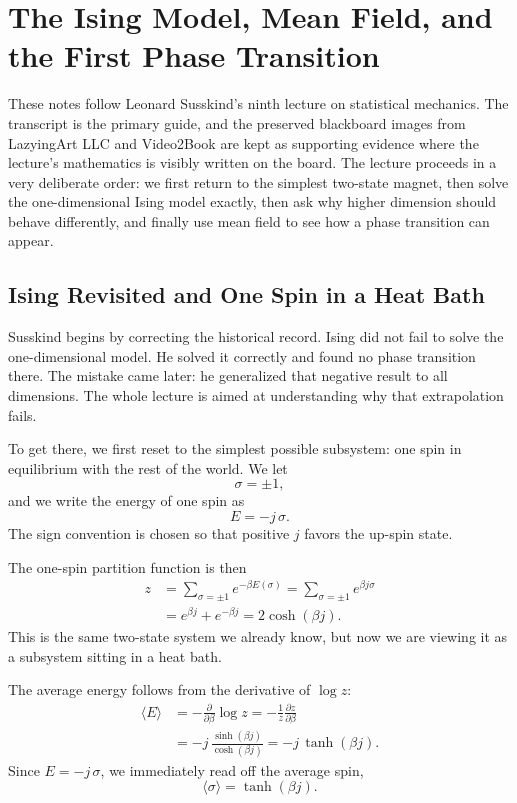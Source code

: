 \chapter{The Ising Model, Mean Field, and the First Phase Transition}

These notes follow Leonard Susskind's ninth lecture on statistical mechanics. The transcript is the primary guide, and the preserved blackboard images from LazyingArt LLC and Video2Book are kept as supporting evidence where the lecture's mathematics is visibly written on the board. The lecture proceeds in a very deliberate order: we first return to the simplest two-state magnet, then solve the one-dimensional Ising model exactly, then ask why higher dimension should behave differently, and finally use mean field to see how a phase transition can appear.

\section{Ising Revisited and One Spin in a Heat Bath}

Susskind begins by correcting the historical record. Ising did not fail to solve the one-dimensional model. He solved it correctly and found no phase transition there. The mistake came later: he generalized that negative result to all dimensions. The whole lecture is aimed at understanding why that extrapolation fails.

To get there, we first reset to the simplest possible subsystem: one spin in equilibrium with the rest of the world. We let
\begin{equation}
\sigma=\pm 1,
\end{equation}
and we write the energy of one spin as
\begin{equation}
E=-j\,\sigma.
\end{equation}
The sign convention is chosen so that positive \(j\) favors the up-spin state.

The one-spin partition function is then
\begin{align}
z &= \sum_{\sigma=\pm 1} e^{-\beta E(\sigma)}
 = \sum_{\sigma=\pm 1} e^{\beta j \sigma} \\
  &= e^{\beta j}+e^{-\beta j}
 = 2\cosh(\beta j).
\end{align}
This is the same two-state system we already know, but now we are viewing it as a subsystem sitting in a heat bath.

The average energy follows from the derivative of \(\log z\):
\begin{align}
\langle E\rangle
  &= -\frac{\partial}{\partial \beta}\log z
   = -\frac{1}{z}\frac{\partial z}{\partial \beta} \\
  &= -j\,\frac{\sinh(\beta j)}{\cosh(\beta j)}
   = -j\,\tanh(\beta j).
\end{align}
Since \(E=-j\,\sigma\), we immediately read off the average spin,
\begin{equation}
\langle \sigma\rangle = \tanh(\beta j).
\end{equation}


